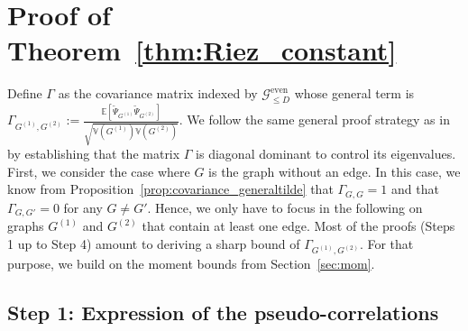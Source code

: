 \documentclass{article}
\begin{document}
\section{Proof of Theorem~\ref{thm:Riez_constant}}\label{sec:proof:Riez}


Define $\Gamma$ as the covariance matrix indexed by $\mathcal{G}_{\leq D}^{\mathrm{even}}$ whose general term is $\Gamma_{G^{(1)},G^{(2)}}:=\frac{\mathbb{E}[\widetilde{\Psi}_{G^{(1)}} \widetilde{\Psi}_{G^{(2)}}]}{\sqrt{\mathbb V(G^{(1)}){\mathbb V}(G^{(2)})}}$. We follow the same general proof strategy as in~\cite{CGGV25} by establishing that the matrix $\Gamma$ is diagonal dominant to control its eigenvalues. First, we consider the case where $G$  is the graph without an edge. In this case, we know from Proposition~\ref{prop:covariance_generaltilde} that $\Gamma_{G,G}=1$ and that $\Gamma_{G,G'}=0$ for any $G\neq G'$. Hence, we only have to focus in the following on graphs $G^{(1)}$ and $G^{(2)}$ that contain at least one edge. Most of the proofs (Steps 1 up to Step 4) amount to deriving a sharp bound of  $\Gamma_{G^{(1)},G^{(2)}}$. For that purpose, we build on the moment bounds from Section~\ref{sec:mom}.



\subsection{Step 1: Expression of the pseudo-correlations}
\end{document}
